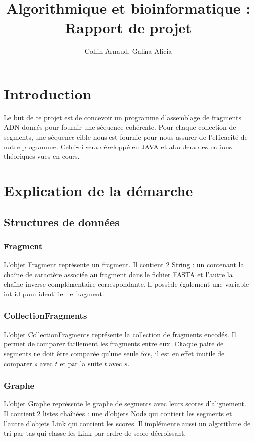 \documentclass{article}
\begin{document}
\title{Algorithmique et bioinformatique : Rapport de projet}
\author{Collin Arnaud, Galina Alicia}
\maketitle
\newpage
\tableofcontents
\newpage
\section{Introduction}
Le but de ce projet est de concevoir un programme d'assemblage de fragments ADN donnés pour fournir une séquence cohérente. Pour chaque collection de segments, une séquence cible nous est fournie pour nous assurer de l'efficacité de notre programme. Celui-ci sera développé en JAVA et abordera des notions théoriques vues en cours.

\section{Explication de la démarche}

\subsection{Structures de données}
\subsubsection{Fragment}
L'objet Fragment représente un fragment. Il contient 2 String : un contenant la chaîne de caractère associée au fragment dans le fichier FASTA et l'autre la chaîne inverse complémentaire correspondante. Il possède également une variable int id pour identifier le fragment.

\subsubsection{CollectionFragments}
L'objet CollectionFragments représente la collection de fragments encodés. Il permet de comparer facilement les fragments entre eux.
Chaque paire de segments ne doit être comparée qu'une seule fois, il est en effet inutile de comparer $s$ avec $t$ et par la suite $t$ avec $s$.

\subsubsection{Graphe}
L'objet Graphe représente le graphe de segments avec leurs scores d'alignement. Il contient 2 listes chaînées : une d'objets Node qui contient les segments et l'autre d'objets Link qui contient les scores. Il implémente aussi un algorithme de tri par tas qui classe les Link par ordre de score décroissant.
\end{document}
